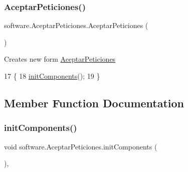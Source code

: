 \subsubsection{\texorpdfstring{Aceptar\+Peticiones()}{AceptarPeticiones()}}
{\footnotesize\ttfamily software.\+Aceptar\+Peticiones.\+Aceptar\+Peticiones (\begin{DoxyParamCaption}{ }\end{DoxyParamCaption})\hspace{0.3cm}{\ttfamily [inline]}}

Creates new form \mbox{\hyperlink{classsoftware_1_1_aceptar_peticiones}{Aceptar\+Peticiones}} 
\begin{DoxyCode}
17                                \{
18         \mbox{\hyperlink{classsoftware_1_1_aceptar_peticiones_a18fadc32c6a77b286202be5dfbdb11b2}{initComponents}}();
19     \}
\end{DoxyCode}


\subsection{Member Function Documentation}
\mbox{\label{classsoftware_1_1_aceptar_peticiones_a18fadc32c6a77b286202be5dfbdb11b2}} 
\subsubsection{\texorpdfstring{init\+Components()}{initComponents()}}
{\footnotesize\ttfamily void software.\+Aceptar\+Peticiones.\+init\+Components (\begin{DoxyParamCaption}{ }\end{DoxyParamCaption})\hspace{0.3cm}{\ttfamily [inline]}, {\ttfamily [private]}}

